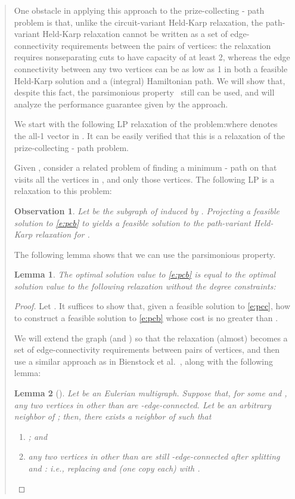 \documentclass[11pt,letterpaper]{article}
\newtheorem{lemma}{Lemma}
\newtheorem{obs}{Observation}
\newcommand{\st}{\mbox{-} }
\begin{document}
\begin{quote}
One obstacle in applying this approach to the prize-collecting \st path problem is that, unlike the circuit-variant Held-Karp relaxation, the path-variant Held-Karp relaxation cannot be written as a set of edge-connectivity requirements between the pairs of vertices: the relaxation requires nonseparating cuts to have capacity of at least 2, whereas the edge connectivity between any two vertices can be as low as 1 in both a feasible Held-Karp solution and a (integral) Hamiltonian path. We will show that, despite this fact, the parsimonious property~\cite{GB} still can be used, and will analyze the performance guarantee given by the approach.

We start with the following LP relaxation of the problem:where  denotes the all-1 vector in . It can be easily verified that this is a relaxation of the prize-collecting \st path problem.

Given , consider a related problem of finding a minimum \st path on  that visits all the vertices in , and only those vertices. The following LP is a relaxation to this problem:

\begin{obs}\label{o:pchk}
Let  be the subgraph of  induced by . Projecting a feasible solution to \eqref{e:pcb} to  yields a feasible solution to the path-variant Held-Karp relaxation for .
\end{obs}

The following lemma shows that we can use the parsimonious property.

\begin{lemma}\label{l:pcpp}
The optimal solution value to \eqref{e:pcb} is equal to the optimal solution value to the following relaxation without the degree constraints:
\end{lemma}
\begin{proof}
Let . It suffices to show that, given a feasible solution  to \eqref{e:pcc}, how to construct a feasible solution to \eqref{e:pcb} whose cost is no greater than .

We will extend the graph (and ) so that the relaxation (almost) becomes a set of edge-connectivity requirements between pairs of vertices, and then use a similar approach as in Bienstock et al.~\cite{BGSW}, along with the following lemma:
\begin{lemma}[\cite{BGSW}]\label{l:pcsplit}
Let  be an Eulerian multigraph. Suppose that, for some  and , any two vertices in  other than  are -edge-connected. Let  be an arbitrary neighbor of ; then, there exists a neighbor  of  such that\begin{enumerate}
\item ; and
\item any two vertices in  other than  are still -edge-connected after splitting  and : i.e., replacing  and  (one copy each) with .
\end{enumerate}
\end{lemma}


\end{proof}
\end{quote}
\end{document}

